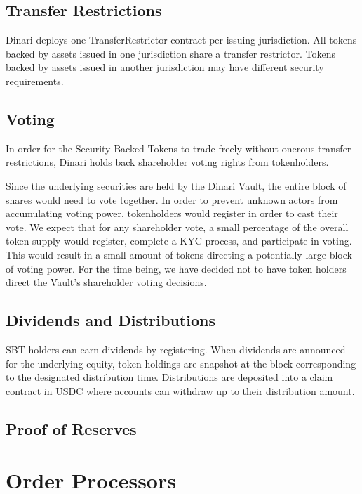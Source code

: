 \documentclass[sigconf,nonacm,prologue,table]{acmart}
\numberwithin{equation}{section}
\theoremstyle{definition}
\theoremstyle{remark}
\begin{document}
\subsection{Transfer Restrictions}

Dinari deploys one TransferRestrictor contract per issuing jurisdiction. All tokens backed by assets issued in one jurisdiction share a transfer restrictor. Tokens backed by assets issued in another jurisdiction may have different security requirements.

\subsection{Voting}

In order for the Security Backed Tokens to trade freely without onerous transfer restrictions, Dinari holds back shareholder voting rights from tokenholders.

Since the underlying securities are held by the Dinari Vault, the entire block of shares would need to vote together. In order to prevent unknown actors from accumulating voting power, tokenholders would register in order to cast their vote. We expect that for any shareholder vote, a small percentage of the overall token supply would register, complete a KYC process, and participate in voting. This would result in a small amount of tokens directing a potentially large block of voting power. For the time being, we have decided not to have token holders direct the Vault’s shareholder voting decisions.

\subsection{Dividends and Distributions}

SBT holders can earn dividends by registering. When dividends are announced for the underlying equity, token holdings are snapshot at the block corresponding to the designated distribution time. Distributions are deposited into a claim contract in USDC where accounts can withdraw up to their distribution amount.

\subsection{Proof of Reserves}

\section{Order Processors}
\label{sec:Processors}
\end{document}
